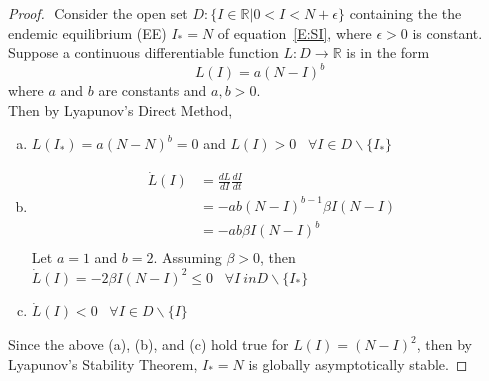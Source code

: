     \begin{proof}
      $ $\newline	
      Consider the open set $D: \{I \in \mathbb{R}| 0 < I < N+ \epsilon \}$ containing the the endemic equilibrium (EE) $I_* = N$ of equation~\eqref{E:SI}, where $\epsilon > 0$ is constant. 
      Suppose a continuous differentiable function $L:D\rightarrow \mathbb{R}$  is in the form
      \begin{equation}
      L(I) = a(N-I)^b
      \end{equation} where $a$ and $b$ are constants and $a, b > 0$.\\
      
      Then by Lyapunov's Direct Method,

      \begin{enumerate}[(a)]
      	\item $L(I_*) = a(N-N)^b = 0$ and $L(I)>0$ \, $\forall I\in D\backslash \{I_*\}$
      	\item
        \begin{align*}
            \dot{L}(I)  &= \frac{dL}{dI} \frac{dI}{dt} \\
      					&= -ab(N-I)^{b-1}\beta I(N-I)\\
      					&= -ab\beta I(N-I)^b\\
      	\end{align*}
      	Let $a = 1$ and $b = 2$. Assuming $\beta>0$, then\\
      	$\dot{L}(I) = -2\beta I(N-I)^2 \leq 0$ \, $\forall I\ in D \backslash \{I_*\}$
      	\item $\dot{L}(I) < 0$ \, $\forall I\in D\backslash \{I\}$
      \end{enumerate}
      
  	  Since the above (a), (b), and (c) hold true for $L(I) = (N-I)^2$, then by Lyapunov's Stability Theorem, $I_* = N$ is globally asymptotically stable. 
    \end{proof}
